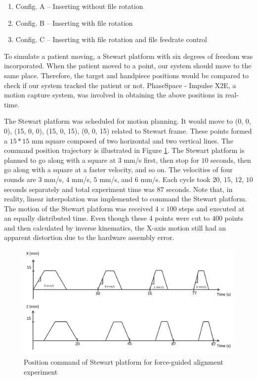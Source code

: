 \begin{enumerate}
\item[] Config. A -- Inserting without file rotation
\item[] Config. B -- Inserting with file rotation
\item[] Config. C -- Inserting with file rotation and file feedrate control
\end{enumerate}
\par
To simulate a patient moving, a Stewart platform with six degrees of freedom was incorporated.  When the patient moved to a point, our system should move to the same place. Therefore, the target and handpiece positions would be compared to check if our system tracked the patient or not. PhaseSpace - Impulse X2E, a motion capture system, was involved in obtaining the above positions in real-time. 
\par
The Stewart platform was scheduled for motion planning. It would move to (0, 0, 0), (15, 0, 0), (15, 0, 15), (0, 0, 15) related to Stewart frame. These points formed a $15*15$ mm square composed of two horizontal and two vertical lines. The command position trajectory is illustrated in Figure \ref{fig: position command}. The Stewart platform is planned to go along with a square at $3$ mm/s first, then stop for $10$ seconds, then go along with a square at a faster velocity, and so on. The velocities of four rounds are $3$ mm/s, $4$ mm/s, $5$ mm/s, and $6$ mm/s. Each cycle took $20$, $15$, $12$, $10$ seconds separately and total experiment time was $87$ seconds. Note that, in reality, linear interpolation was implemented to command the Stewart platform. The motion of the Stewart platform was received $4 \times 100$ steps and executed at an equally distributed time. Even though these $4$ points were cut to $400$ points and then calculated by inverse kinematics, the X-axis motion still had an apparent distortion due to the hardware assembly error.
\begin{figure}[htbp]
\begin{center}
\includegraphics[width=1\linewidth]{Images/position command.png}
\caption{Position command of Stewart platform for force-guided alignment experiment}
\label{fig: position command}
\end{center}
\end{figure}	
